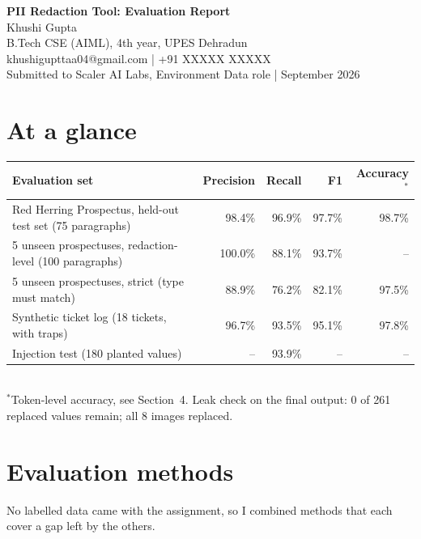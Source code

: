 \documentclass[11pt,a4paper]{article}
\begin{document}
\begin{center}
{\LARGE\bfseries PII Redaction Tool: Evaluation Report}\\[6pt]
{\large Khushi Gupta}\\
B.Tech CSE (AIML), 4th year, UPES Dehradun\\
khushigupttaa04@gmail.com \quad | \quad +91 XXXXX XXXXX\\[2pt]
Submitted to Scaler AI Labs, Environment Data role \quad |  September 2026
\end{center}

\section{At a glance}
\begin{tabularx}{\textwidth}{@{}Lrrrr@{}}
\toprule
\textbf{Evaluation set} & \textbf{Precision} & \textbf{Recall} & \textbf{F1} & \textbf{Accuracy}$^{*}$ \\
\midrule
Red Herring Prospectus, held-out test set (75 paragraphs) & 98.4\% & 96.9\% & 97.7\% & 98.7\% \\
5 unseen prospectuses, redaction-level (100 paragraphs) & 100.0\% & 88.1\% & 93.7\% & -- \\
5 unseen prospectuses, strict (type must match) & 88.9\% & 76.2\% & 82.1\% & 97.5\% \\
Synthetic ticket log (18 tickets, with traps) & 96.7\% & 93.5\% & 95.1\% & 97.8\% \\
Injection test (180 planted values) & -- & 93.9\% & -- & -- \\
\bottomrule
\end{tabularx}\\[2pt]
{\small $^{*}$Token-level accuracy, see Section~4. Leak check on the final output: 0 of 261 replaced values remain; all 8 images replaced.}

\section{Evaluation methods}
No labelled data came with the assignment, so I combined methods that each cover a gap left by the others.
\end{document}
